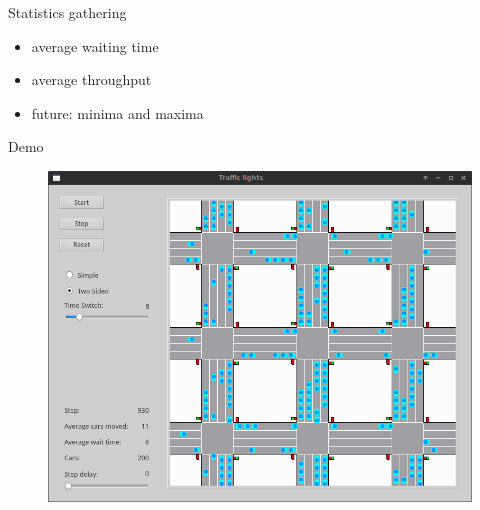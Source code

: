 \documentclass[11pt]{beamer}
\begin{document}
\begin{frame}{Statistics gathering}
\begin{itemize}
\item average waiting time
\item average throughput
\item future: minima and maxima
\end{itemize}
\end{frame}

\begin{frame}{Demo}
\begin{figure}
\centering
\includegraphics[width=.8\textwidth]{ui.png}
\end{figure}
\end{frame}
\end{document}
